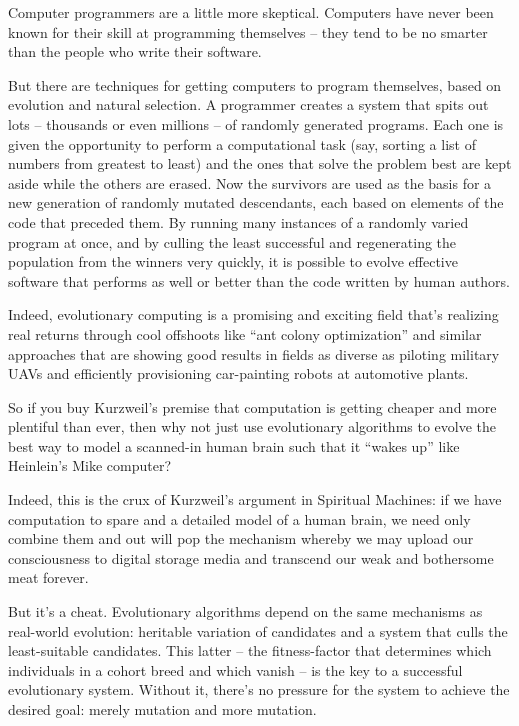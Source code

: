 Computer programmers are a little more skeptical. Computers have
never been known for their skill at programming themselves -- they
tend to be no smarter than the people who write their software.

But there are techniques for getting computers to program
themselves, based on evolution and natural selection. A programmer
creates a system that spits out lots -- thousands or even millions
-- of randomly generated programs. Each one is given the
opportunity to perform a computational task (say, sorting a list of
numbers from greatest to least) and the ones that solve the problem
best are kept aside while the others are erased. Now the survivors
are used as the basis for a new generation of randomly mutated
descendants, each based on elements of the code that preceded them.
By running many instances of a randomly varied program at once, and
by culling the least successful and regenerating the population
from the winners very quickly, it is possible to evolve effective
software that performs as well or better than the code written by
human authors.

Indeed, evolutionary computing is a promising and exciting field
that's realizing real returns through cool offshoots like ``ant
colony optimization'' and similar approaches that are showing good
results in fields as diverse as piloting military UAVs and
efficiently provisioning car-painting robots at automotive plants.

So if you buy Kurzweil's premise that computation is getting
cheaper and more plentiful than ever, then why not just use
evolutionary algorithms to evolve the best way to model a
scanned-in human brain such that it ``wakes up'' like Heinlein's Mike
computer?

Indeed, this is the crux of Kurzweil's argument in Spiritual
Machines: if we have computation to spare and a detailed model of a
human brain, we need only combine them and out will pop the
mechanism whereby we may upload our consciousness to digital
storage media and transcend our weak and bothersome meat
forever.

But it's a cheat. Evolutionary algorithms depend on the same
mechanisms as real-world evolution: heritable variation of
candidates and a system that culls the least-suitable candidates.
This latter -- the fitness-factor that determines which individuals
in a cohort breed and which vanish -- is the key to a successful
evolutionary system. Without it, there's no pressure for the system
to achieve the desired goal: merely mutation and more mutation.

